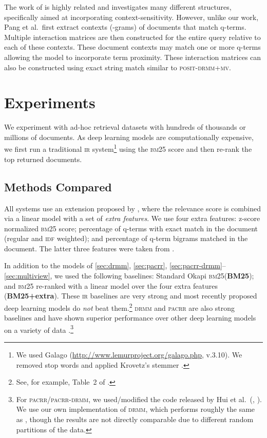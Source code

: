 \documentclass[11pt,a4paper]{article}
\newcommand{\ir}{\textsc{ir}\xspace}
\newcommand{\drmm}{\textsc{drmm}\xspace}
\newcommand{\pacrr}{\textsc{pacrr}\xspace}
\newcommand{\pacrrdrmm}{\textsc{pacrr-drmm}\xspace}
\newcommand{\positdrmmmv}{\textsc{posit-drmm+mv}\xspace}
\newcommand{\bmtf}{\textsc{bm25}\xspace}
\newcommand{\idf}{\textsc{idf}\xspace}
\begin{document}
The work of  
is highly related and investigates many different structures, specifically aimed at incorporating context-sensitivity. However, unlike our work, Pang et al.\ first extract contexts 
(-grams) of documents that match q-terms. Multiple interaction matrices are then constructed for the entire query relative to each of these contexts. These document contexts may match one or more q-terms allowing the model to incorporate term proximity. These interaction matrices can also be constructed using exact string match similar to \positdrmmmv.



\section{Experiments}

We experiment with ad-hoc retrieval datasets with hundreds of thousands or millions of documents.  
As deep learning models are computationally expensive, we first run a traditional \ir system\footnote{We used Galago (\url{http://www.lemurproject.org/galago.php}, v.3.10). We removed stop words and applied Krovetz's stemmer \cite{krovetz1993krovetzstemmer}.} using the \bmtf score \cite{robertson2009probabilistic} and then re-rank the top  returned documents.

\subsection{Methods Compared}

All systems use an extension proposed by , where the relevance score is combined via a linear model with a set of \emph{extra features}. We use four extra features: z-score normalized \bmtf score; percentage of 
q-terms with exact match in the document (regular and \idf weighted); and percentage of 
q-term bigrams matched in the document. The latter three features were taken from .

In addition to the models  
of \ref{sec:drmm}, \ref{sec:pacrr}, \ref{sec:pacrr-drmm}--\ref{sec:multiview}, we used the following baselines:
Standard Okapi \bmtf (\textbf{BM25}); and \bmtf re-ranked with a linear model over the four extra features (\textbf{BM25+extra}).
These \ir baselines are very strong and most recently proposed deep learning models do \emph{not} beat them.\footnote{See, for example, Table~2 of .} 
\drmm and \pacrr are also strong baselines
and have shown superior performance over other deep 
learning models on a variety of data \cite{guo2016deep,hui2017pacrr}.\footnote{For \pacrr/\pacrrdrmm, we used/modified the code released by Hui et al.\ (\citeyear{hui2017pacrr}, \citeyear{hui2018copacrr}). We use our own implementation of \drmm, which performs roughly the same as , though the results are not directly comparable due to different random partitions of the data.}
\end{document}
